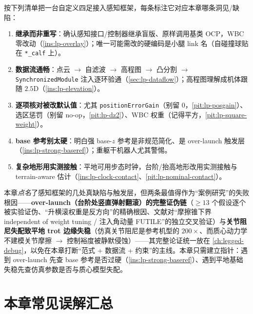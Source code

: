 \begin{practice}
按下列清单把一台自定义四足接入感知框架，每条标注它对应本章哪条洞见/缺陷：
\begin{enumerate}
  \item \textbf{继承而非重写}：确认感知接口/控制器继承盲版、原样调用基类 OCP，WBC 零改动（\cref{ins:lp-overlay}）；唯一可能需改的硬编码是小腿 link 名（自碰撞球贴在 \texttt{*\_calf} 上）。
  \item \textbf{数据流通畅}：点云 $\to$ 自滤波 $\to$ 高程图 $\to$ 凸分割 $\to$ \texttt{SynchronizedModule} 注入逐环验通（\cref{sec:lp-dataflow}）；高程图理解成机体跟随 $2.5$D（\cref{ins:lp-elevation}）。
  \item \textbf{逐项核对被改默认值}：尤其 \texttt{positionErrorGain}（别留 $0$，\cref{pit:lp-posgain}）、选区惩罚（别留 no-op，\cref{pit:lp-dz2}）、WBC 权重（记得平方，\cref{pit:lp-square-weight}）。
  \item \textbf{base 参考别太硬}：明白强 base-$z$ 参考是非规范简化、是 over-launch 触发层（\cref{ins:lp-strong-baseref}）；重躯干机器人尤其警惕。
  \item \textbf{复杂地形用实测接触}：平地可用步态时钟，台阶/抬高地形改用实测接触与 terrain-aware 估计（\cref{ins:lp-clock-contact}、\cref{pit:lp-nominal-contact}）。
\end{enumerate}
\end{practice}

\begin{note}\label{note:lp-failure-pointer}
本章\emph{点名}了感知框架的几处真缺陷与触发层，但两条最值得作为“案例研究”的失败根因——\textbf{over-launch（台阶处竖直弹射翻滚）的完整证伪链}（$\ge 13$ 个假设逐个被实验证伪、“升横滚权重是反方向”的精确根因、文献对“摩擦锥下界 independent of weight tuning / 注入角动量 FUTILE”的独立交叉验证）与\textbf{关节阻尼失配致平地 trot 边缘失稳}（仿真关节阻尼是参考机型的 $200\times$、而质心动力学不建模关节摩擦 $\to$ 控制裕度被静默侵蚀）——其完整论证统一放在 \cref{ch:legged-debug}，以免在本章打断“范式 + 数据流 + 约束”的主线。本章只需建立指针：遇到 over-launch 先查 base 参考是否过硬（\cref{ins:lp-strong-baseref}）、遇到平地基础失稳先查仿真参数是否与质心模型失配。
\end{note}

\section*{本章常见误解汇总}


